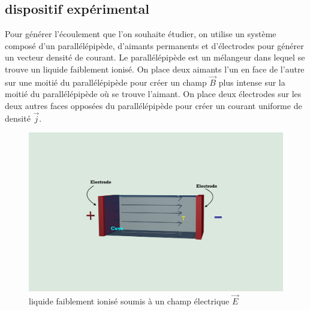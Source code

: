 \documentclass[a4paper,12pt,titlepage]{report}
\begin{document}
\begin{onehalfspace}
\subsection{dispositif expérimental} 

Pour générer l'écoulement que l'on souhaite étudier, on utilise un système composé d'un parallélépipède, d'aimants permanents et d’électrodes pour générer un vecteur densité de courant. Le parallélépipède est un mélangeur dans lequel se trouve un liquide faiblement ionisé.
On place deux aimants l’un en face de l’autre sur une moitié du parallélépipède pour créer un champ $\vec{B}$ plus intense sur la moitié du parallélépipède où se trouve l'aimant. On place deux électrodes sur les deux autres faces opposées du parallélépipède pour créer un courant uniforme de densité $\vec{j}$.
\begin{figure}[!h]
	\begin{center}
	\centering	
		\includegraphics[height = 7cm, keepaspectratio]{graphes/blender_cuve_champvec.png}
		\caption{liquide faiblement ionisé soumis à un champ électrique $\vec{E}$}
	\end{center}
\end{figure}
\newline 
\begin{figure}[!h]
	\begin{center}
	\centering

\end{center}
\end{figure}
\end{onehalfspace}
\end{document}

